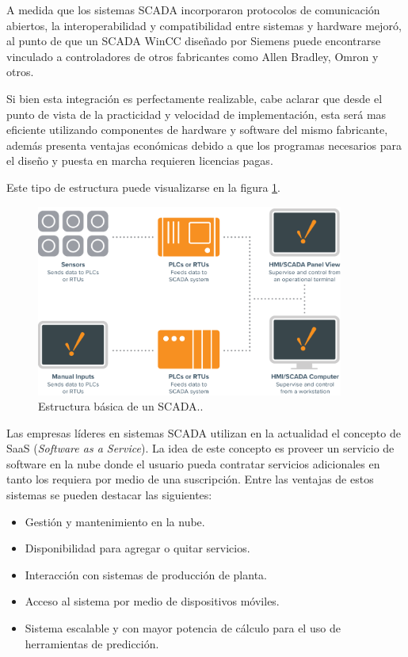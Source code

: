 A medida que los sistemas SCADA incorporaron protocolos de comunicación abiertos, la interoperabilidad y compatibilidad entre sistemas y hardware mejoró, al punto de que un SCADA WinCC diseñado por Siemens puede encontrarse vinculado a controladores de otros fabricantes como Allen Bradley, Omron y otros.

Si bien esta integración es perfectamente realizable, cabe aclarar que desde el punto de vista de la practicidad y velocidad de implementación, esta será mas eficiente utilizando componentes de hardware y software del mismo fabricante, además presenta ventajas económicas debido a que los programas necesarios para el diseño y puesta en marcha requieren licencias pagas.

Este tipo de estructura puede visualizarse en la figura \ref{fig:SCNOW}.

\begin{figure}[htbp]
	\centering
	\includegraphics[width=0.9\textwidth]{./Figures/BasicSCADA.png}
	\caption{Estructura básica de un SCADA.\protect\footnotemark.}
	\label{fig:SCNOW}
\end{figure}
 
Las empresas líderes en sistemas SCADA utilizan en la actualidad el concepto de SaaS (\textit{Software as a Service})\citep{ARTICLE2}. La idea de este concepto es proveer un servicio de software en la nube donde el usuario pueda contratar servicios adicionales en tanto los requiera por medio de una suscripción. Entre las ventajas de estos sistemas se pueden destacar las siguientes:

\begin{itemize}
	\item Gestión y mantenimiento en la nube.
	\item Disponibilidad para agregar o quitar servicios.
	\item Interacción con sistemas de producción de planta.
	\item Acceso al sistema por medio de dispositivos móviles. 
	\item Sistema escalable y con mayor potencia de cálculo para el uso de herramientas de predicción.
\end{itemize}

